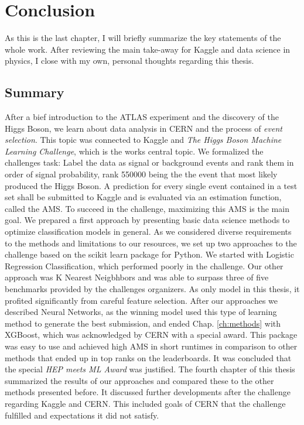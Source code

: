 \section{Conclusion}\label{ch:conc}
As this is the last chapter, I will briefly summarize the key statements of the whole work.
After reviewing the main take-away for Kaggle and data science in physics, I close with my own, personal thoughts regarding this thesis.

\subsection{Summary}
After a bief introduction to the ATLAS experiment and the discovery of the Higgs Boson, we learn about data analysis in CERN and the process of \emph{event selection}. This topic was connected to Kaggle and \emph{The Higgs Boson Machine Learning Challenge}, which is the works central topic.
We formalized the challenges task: Label the data as signal or background events and rank them in order of signal probability, rank 550000 being the the event that most likely produced the Higgs Boson. A prediction for every single event contained in a test set shall be submitted to Kaggle and is evaluated via an estimation function, called the AMS. To succeed in the challenge, maximizing this AMS is the main goal.
We prepared a first approach by presenting basic data science methods to optimize classification models in general. As we considered diverse requirements to the methods and limitations to our resources, we set up two approaches to the challenge based on the scikit learn package for Python. We started with Logistic Regression Classification, which performed poorly in the challenge. Our other approach was K Nearest Neigbhbors and was able to surpass three of five benchmarks provided by the challenges organizers. As only model in this thesis, it profited significantly from careful feature selection.
After our approaches we described Neural Networks, as the winning model used this type of learning method to generate the best submission, and ended Chap. \ref{ch:methods} with XGBoost, which was acknowledged by CERN with a special award. This package was easy to use and achieved high AMS in short runtimes in comparison to other methods that ended up in top ranks on the leaderboards. It was concluded that the special \emph{HEP meets ML Award} was justified.
The fourth chapter of this thesis summarized the results of our approaches and compared these to the other methods presented before. It discussed further developments after the challenge regarding Kaggle and CERN. This included goals of CERN that the challenge fulfilled and expectations it did not satisfy.

